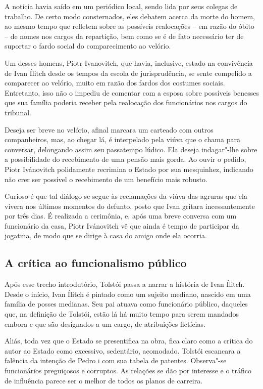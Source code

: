 \documentclass[12pt]{extarticle}
\begin{document}
A notícia havia saído em um periódico local, sendo lida por seus colegas de
trabalho. De certo modo consternados, eles debatem acerca da morte do
homem, ao mesmo tempo que refletem sobre as possíveis realocações -- em
razão do óbito -- de nomes nos cargos da repartição, bem como se é de
fato necessário ter de suportar o fardo social do comparecimento ao
velório.

Um desses homens, Piotr Ivanovitch, que havia, inclusive, estado na
convivência de Ivan Ílitch desde os tempos da escola de jurisprudência,
se sente compelido a comparecer ao velório, muito em razão dos fardos
dos costumes sociais. Entretanto, isso não o impediu de comentar com a
esposa sobre possíveis benesses que sua família poderia receber pela
realocação dos funcionários nos cargos do tribunal.

Deseja ser breve no velório, afinal marcara um carteado com outros
companheiros, mas, ao chegar lá, é interpelado pela viúva que o chama
para conversar, delongando assim seu passatempo lúdico. Ela deseja
indagar"-lhe sobre a possibilidade do recebimento de uma pensão mais
gorda. Ao ouvir o pedido, Piotr Ivánovitch polidamente recrimina o
Estado por sua mesquinhez, indicando não crer ser possível o recebimento
de um benefício mais robusto.


Curioso é que tal diálogo se segue às reclamações da viúva das agruras
que ela vivera nos últimos momentos do defunto, posto que 
Ivan gritara incessantemente por três dias. 
É realizada a cerimônia, e, após uma breve conversa com um funcionário
da casa, Piotr Ivánovitch vê que ainda é tempo de participar da
jogatina, de modo que se dirige à casa do amigo onde ela ocorria.

\subsection{A crítica ao funcionalismo público}

Após esse trecho introdutório, Tolstói passa a narrar a história de
Ivan Ílitch. Desde o início, Ivan Ílitch é pintado como um sujeito
mediano, nascido em uma família de posses medianas. Seu pai atuava como
funcionário público, daqueles que, na definição de Tolstói, estão lá há
muito tempo para serem mandados embora e que são designados a um cargo, 
de atribuições fictícias.

Aliás, toda vez que o Estado se presentifica na obra, fica claro 
como a crítica do autor ao Estado como excessivo, sedentário, 
acomodado. Tolstói escancara a
falência da intenção de Pedro \textsc{i} com sua tabela de patentes. Observa"-se
funcionários preguiçosos e corruptos. As relações se dão
por interesse e o tráfico de influência parece ser o melhor de todos os
planos de carreira.
\end{document}
